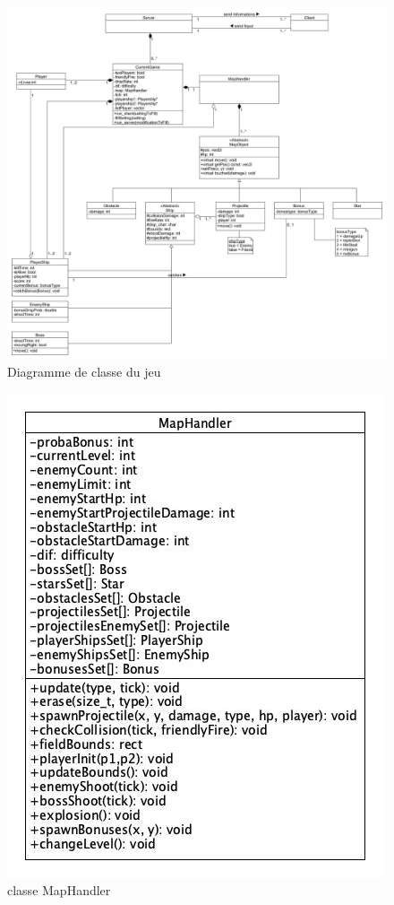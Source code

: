 \documentclass[a4paper,12pt]{article}
\begin{document}
\begin{figure}[hbtp]
\centering
\includegraphics[scale=0.3]{images/newGameClassDiagram.jpg}
\caption{Diagramme de classe du jeu}
\end{figure}

\begin{figure}[hbtp]
\centering
\includegraphics[scale=0.3]{images/mapHandlerDiagram.jpg}
\caption{classe MapHandler}
\end{figure}
\end{document}
